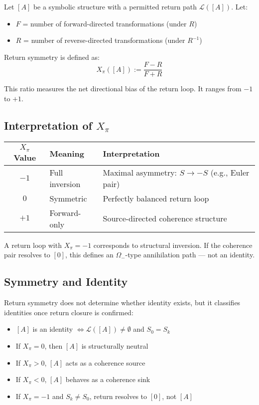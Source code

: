 \begin{definition} \label{def:return-symmetry}
Let $[A]$ be a symbolic structure with a permitted return path $\mathcal{L}([A])$.  
Let:
\begin{itemize}
  \item $F$ = number of forward-directed transformations (under $R$)
  \item $R$ = number of reverse-directed transformations (under $R^{-1}$)
\end{itemize}

Return symmetry is defined as:
\begin{equation} \label{eq:return-symmetry}
X_\pi([A]) := \frac{F - R}{F + R}
\end{equation}

This ratio measures the net directional bias of the return loop. It ranges from $-1$ to $+1$.
\end{definition}

\subsection*{Interpretation of $X_\pi$} \label{interpretation-of-xpi}

\begin{center}
\begin{tabular}{|c|l|l|}
\hline
\textbf{$X_\pi$ Value} & \textbf{Meaning} & \textbf{Interpretation} \\
\hline
$-1$ & Full inversion & Maximal asymmetry: $S \rightarrow -S$ (e.g., Euler pair) \\
$0$  & Symmetric      & Perfectly balanced return loop \\
$+1$ & Forward-only   & Source-directed coherence structure \\
\hline
\end{tabular}
\end{center}

A return loop with $X_\pi = -1$ corresponds to structural inversion.  
If the coherence pair resolves to $[0]$, this defines an $\Omega_-$-type annihilation path — not an identity.

\subsection*{Symmetry and Identity} \label{symmetry-and-identity}

Return symmetry does not determine whether identity exists, but it classifies identities once return closure is confirmed:
\begin{itemize}
  \item $[A]$ is an identity $\iff \mathcal{L}([A]) \neq \emptyset$ and $S_0 = S_k$
  \item If $X_\pi = 0$, then $[A]$ is structurally neutral
  \item If $X_\pi > 0$, $[A]$ acts as a coherence source
  \item If $X_\pi < 0$, $[A]$ behaves as a coherence sink
  \item If $X_\pi = -1$ and $S_k \neq S_0$, return resolves to $[0]$, not $[A]$
\end{itemize}

